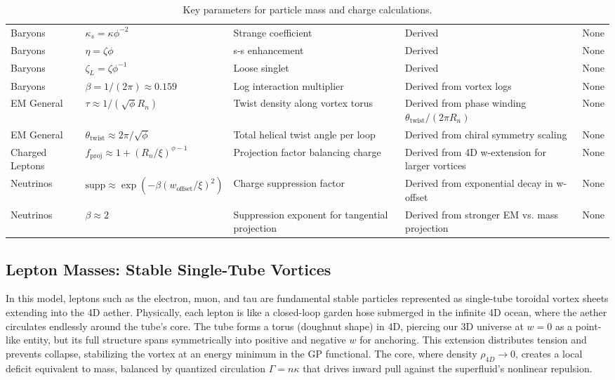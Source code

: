 \begin{sidewaystable}[p]
\begin{tabular}{|p{2cm}|p{3cm}|p{6cm}|p{6cm}|p{3cm}|}
Baryons & $\kappa_s = \kappa \phi^{-2}$ & Strange coefficient & Derived & None \\
Baryons & $\eta = \zeta \phi$ & s-s enhancement & Derived & None \\
Baryons & $\zeta_L = \zeta \phi^{-1}$ & Loose singlet & Derived & None \\
Baryons & $\beta = 1/(2\pi) \approx 0.159$ & Log interaction multiplier & Derived from vortex logs & None \\
EM General & $\tau \approx 1 / (\sqrt{\phi} R_n)$ & Twist density along vortex torus & Derived from phase winding $\theta_{\text{twist}} / (2\pi R_n)$ & None \\
EM General & $\theta_{\text{twist}} \approx 2\pi / \sqrt{\phi}$ & Total helical twist angle per loop & Derived from chiral symmetry scaling & None \\
Charged Leptons & $f_{\text{proj}} \approx 1 + (R_n / \xi)^{\phi - 1}$ & Projection factor balancing charge & Derived from 4D w-extension for larger vortices & None \\
Neutrinos & $\text{supp} \approx \exp( - \beta (w_{\text{offset}} / \xi)^2 )$ & Charge suppression factor & Derived from exponential decay in w-offset & None \\
Neutrinos & $\beta \approx 2$ & Suppression exponent for tangential projection & Derived from stronger EM vs. mass projection & None \\
\hline
\end{tabular}
\caption{Key parameters for particle mass and charge calculations.}
\label{tab:variables}
\end{sidewaystable}

\subsection{Lepton Masses: Stable Single-Tube Vortices}

In this model, leptons such as the electron, muon, and tau are fundamental stable particles represented as single-tube toroidal vortex sheets extending into the 4D aether. Physically, each lepton is like a closed-loop garden hose submerged in the infinite 4D ocean, where the aether circulates endlessly around the tube's core. The tube forms a torus (doughnut shape) in 4D, piercing our 3D universe at $w=0$ as a point-like entity, but its full structure spans symmetrically into positive and negative $w$ for anchoring. This extension distributes tension and prevents collapse, stabilizing the vortex at an energy minimum in the GP functional. The core, where density $\rho_{4D} \to 0$, creates a local deficit equivalent to mass, balanced by quantized circulation $\Gamma = n \kappa$ that drives inward pull against the superfluid's nonlinear repulsion.


